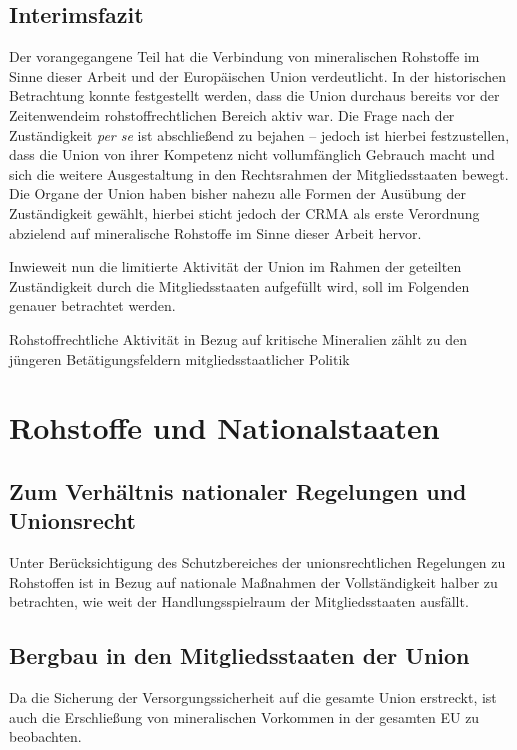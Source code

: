 \documentclass[12pt,a4paper,oneside]{book} %
\begin{document}
\subsection{Interimsfazit}
Der vorangegangene Teil hat die Verbindung von mineralischen Rohstoffe im Sinne dieser Arbeit und der Europäischen Union verdeutlicht. In der historischen Betrachtung konnte festgestellt werden, dass die Union durchaus bereits vor der \glqq Zeitenwende\grqq im rohstoffrechtlichen Bereich aktiv war.
Die Frage nach der Zuständigkeit \textit{per se} ist abschließend zu bejahen -- jedoch ist hierbei festzustellen, dass die Union von ihrer Kompetenz nicht vollumfänglich Gebrauch macht und sich die weitere Ausgestaltung in den Rechtsrahmen der Mitgliedsstaaten bewegt.
Die Organe der Union haben bisher nahezu alle Formen der Ausübung der Zuständigkeit gewählt, hierbei sticht jedoch der CRMA als erste Verordnung abzielend auf mineralische Rohstoffe im Sinne dieser Arbeit hervor.

Inwieweit nun die limitierte Aktivität der Union im Rahmen der geteilten Zuständigkeit durch die Mitgliedsstaaten aufgefüllt wird, soll im Folgenden genauer betrachtet
werden.

Rohstoffrechtliche Aktivität in Bezug auf kritische Mineralien zählt zu den jüngeren Betätigungsfeldern mitgliedsstaatlicher Politik




\section{Rohstoffe und Nationalstaaten}



\subsection{Zum Verhältnis nationaler Regelungen und Unionsrecht}
Unter Berücksichtigung des Schutzbereiches der unionsrechtlichen Regelungen zu Rohstoffen ist in Bezug auf nationale Maßnahmen der Vollständigkeit halber zu betrachten, wie weit der Handlungsspielraum der Mitgliedsstaaten ausfällt.

\subsection{Bergbau in den Mitgliedsstaaten der Union}

Da die Sicherung der Versorgungssicherheit auf die gesamte Union erstreckt, ist auch die Erschließung von mineralischen Vorkommen in der gesamten EU zu beobachten.	
\end{document}
